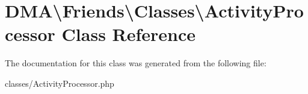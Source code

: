 \hypertarget{classDMA_1_1Friends_1_1Classes_1_1ActivityProcessor}{\section{D\-M\-A\textbackslash{}Friends\textbackslash{}Classes\textbackslash{}Activity\-Processor Class Reference}
\label{classDMA_1_1Friends_1_1Classes_1_1ActivityProcessor}
}


The documentation for this class was generated from the following file\-:\begin{DoxyCompactItemize}
\item 
classes/Activity\-Processor.\-php\end{DoxyCompactItemize}
